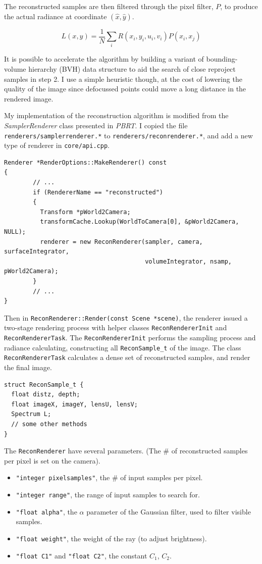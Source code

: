 \documentclass{article}
\begin{document}
The reconstructed samples are then filtered through the pixel filter, $P$, to produce the actual radiance at coordinate $(\hat{x},\hat{y})$.

\[ L(x,y) = \frac{1}{N}\sum_i R(x_i,y_i,u_i,v_i)P(x_i,x_j) \]

It is possible to accelerate the algorithm by building a variant of bounding-volume hierarchy (BVH) data structure to aid the search of close reproject samples in step 2. I use a simple heuristic though, at the cost of lowering the quality of the image since defocussed points could move a long distance in the rendered image.

My implementation of the reconstruction algorithm is modified from the \textit{SamplerRenderer} class presented in \textit{PBRT}. I copied the file \texttt{renderers/samplerrenderer.*} to \texttt{renderers/reconrenderer.*}, and add a new type of renderer in \texttt{core/api.cpp}.

\begin{verbatim}
Renderer *RenderOptions::MakeRenderer() const
{
        // ...
        if (RendererName == "reconstructed")
        {
          Transform *pWorld2Camera;
          transformCache.Lookup(WorldToCamera[0], &pWorld2Camera, NULL);
          renderer = new ReconRenderer(sampler, camera, surfaceIntegrator,
                                       volumeIntegrator, nsamp, pWorld2Camera);
        }
        // ...
}
\end{verbatim}

Then in \texttt{ReconRenderer::Render(const Scene *scene)}, the renderer issued a two-stage rendering process with helper classes \texttt{ReconRendererInit} and \texttt{ReconRendererTask}. The \texttt{ReconRendererInit} performs the sampling process and radiance calculating, constructing all \texttt{ReconSample\_t} of the image. The class \texttt{ReconRendererTask} calculates a dense set of reconstructed samples, and render the final image.

\begin{verbatim}
struct ReconSample_t {
  float distz, depth;
  float imageX, imageY, lensU, lensV;
  Spectrum L;
  // some other methods
}
\end{verbatim}

The \texttt{ReconRenderer} have several parameters. (The \# of reconstructed samples per pixel is set on the camera).

\begin{itemize}
  \item \texttt{"integer pixelsamples"}, the \# of input samples per pixel.
  \item \texttt{"integer range"}, the range of input samples to search for.
  \item \texttt{"float alpha"}, the $\alpha$ parameter of the Gaussian filter, used to filter visible samples.
  \item \texttt{"float weight"}, the weight of the ray (to adjust brightness).
  \item \texttt{"float C1"} and \texttt{"float C2"}, the constant $C_1$, $C_2$.
\end{itemize}
\end{document}
